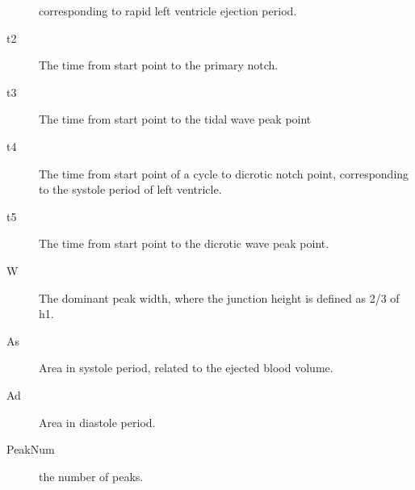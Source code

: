 \begin{description}
        corresponding to rapid left ventricle ejection period. 
    \item[t2] The time from start point to the primary notch.
    \item[t3] The time from start point to the tidal wave peak point
    \item[t4] The time from start point of a cycle to dicrotic
        notch point, corresponding to the systole period of left
        ventricle. 
    \item[t5] The time from start point to the dicrotic wave peak
        point. 
    \item[W] The dominant peak width, where the junction height is
        defined as 2/3 of h1.
    \item[As] Area in systole period, related to the ejected blood volume. 
    \item[Ad] Area in diastole period.
    \item[PeakNum] the number of peaks. 
\end{description}


